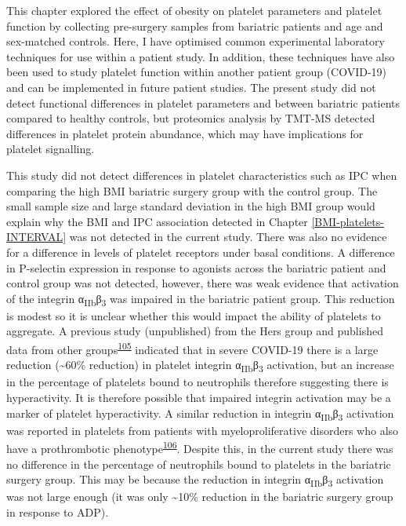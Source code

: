 \documentclass[11pt,twoside]{bristolthesis}
\begin{document}
This chapter explored the effect of obesity on platelet parameters and platelet function by collecting pre-surgery samples from bariatric patients and age and sex-matched controls. Here, I have optimised common experimental laboratory techniques for use within a patient study. In addition, these techniques have also been used to study platelet function within another patient group (COVID-19) and can be implemented in future patient studies. The present study did not detect functional differences in platelet parameters and between bariatric patients compared to healthy controls, but proteomics analysis by TMT-MS detected differences in platelet protein abundance, which may have implications for platelet signalling.

This study did not detect differences in platelet characteristics such as IPC when comparing the high BMI bariatric surgery group with the control group. The small sample size and large standard deviation in the high BMI group would explain why the BMI and IPC association detected in Chapter \ref{BMI-platelets-INTERVAL} was not detected in the current study. There was also no evidence for a difference in levels of platelet receptors under basal conditions. A difference in P-selectin expression in response to agonists across the bariatric patient and control group was not detected, however, there was weak evidence that activation of the integrin α\textsubscript{IIb}β\textsubscript{3} was impaired in the bariatric patient group. This reduction is modest so it is unclear whether this would impact the ability of platelets to aggregate. A previous study (unpublished) from the Hers group and published data from other groups\textsuperscript{\protect\hyperlink{ref-Taus2020}{105}} indicated that in severe COVID-19 there is a large reduction (\textasciitilde60\% reduction) in platelet integrin α\textsubscript{IIb}β\textsubscript{3} activation, but an increase in the percentage of platelets bound to neutrophils therefore suggesting there is hyperactivity. It is therefore possible that impaired integrin activation may be a marker of platelet hyperactivity. A similar reduction in integrin α\textsubscript{IIb}β\textsubscript{3} activation was reported in platelets from patients with myeloproliferative disorders who also have a prothrombotic phenotype\textsuperscript{\protect\hyperlink{ref-Moore2013}{106}}. Despite this, in the current study there was no difference in the percentage of neutrophils bound to platelets in the bariatric surgery group. This may be because the reduction in integrin α\textsubscript{IIb}β\textsubscript{3} activation was not large enough (it was only \textasciitilde10\% reduction in the bariatric surgery group in response to ADP).
\end{document}
